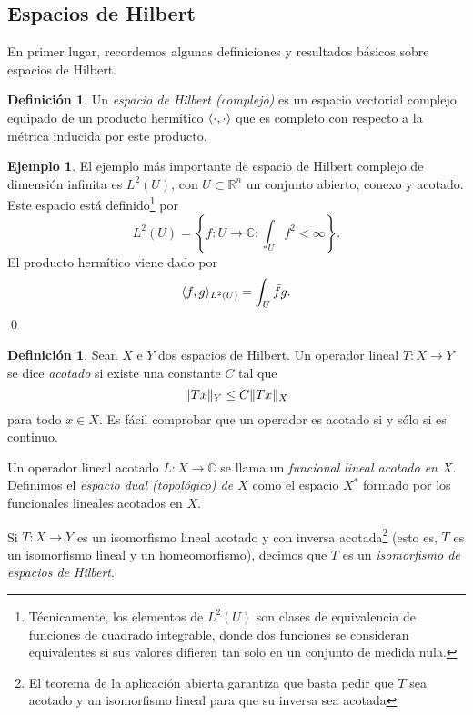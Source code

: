 \documentclass[12pt,a4paper]{article}
\theoremstyle{definition} \newtheorem{defn}[thm]{Definición}
\theoremstyle{definition} \newtheorem{ejemplo}[thm]{Ejemplo}
\theoremstyle{definition} \newtheorem{ejercicio}[thm]{Ejercicio}
\theoremstyle{remark} \newtheorem*{obs}{Observación}
\DeclarePairedDelimiter\norm{\lVert}{\rVert}
\DeclarePairedDelimiter\esc{\langle}{\rangle}
\newcommand{\RR}{\mathbb{R}}
\newcommand{\CC}{\mathbb{C}}
\begin{document}
 \subsection{Espacios de Hilbert}
 En primer lugar, recordemos algunas definiciones y resultados básicos sobre espacios de Hilbert.
 \begin{defn}
   Un \emph{espacio de Hilbert (complejo)}  es un espacio vectorial complejo equipado de un producto hermítico $\esc{\cdot,\cdot}$ que es completo con respecto a la métrica inducida por este producto.
 \end{defn}
 \begin{ejemplo}
   El ejemplo más importante de espacio de Hilbert complejo de dimensión infinita es $L^2(U)$, con $U\subset \RR^n$ un conjunto abierto, conexo y acotado. Este espacio está definido\footnote{Técnicamente, los elementos de $L^2(U)$ son clases de equivalencia de funciones de cuadrado integrable, donde dos funciones se consideran equivalentes si sus valores difieren tan solo en un conjunto de medida nula.} por
   \begin{equation*}
     L^2(U)= \left\{ f:U \rightarrow \CC : \int_U f^2 < \infty \right\}.
   \end{equation*}
   El producto hermítico viene dado por
   \begin{equation*}
     \esc{f,g}_{L^2(U)}=\int_U \bar{f} g.
   \end{equation*}
   \qed
 \end{ejemplo}
 \begin{defn}
   Sean $X$ e $Y$ dos espacios de Hilbert. Un operador lineal $T:X\rightarrow Y$ se dice \emph{acotado} si existe una constante $C$ tal que
   \begin{equation*}
     \norm{Tx}_Y \leq C \norm{Tx}_X
   \end{equation*}
   para todo $x\in X$. Es fácil comprobar que un operador es acotado si y sólo si es continuo.

   Un operador lineal acotado $L:X\rightarrow \CC$ se llama un \emph{funcional lineal acotado en $X$}. Definimos el \emph{espacio dual (topológico) de $X$} como el espacio $X^*$ formado por los funcionales lineales acotados en $X$. 

   Si $T:X\rightarrow Y$ es un isomorfismo lineal acotado y con inversa acotada\footnote{El teorema de la aplicación abierta garantiza que basta pedir que $T$ sea acotado y un isomorfismo lineal para que su inversa sea acotada} (esto es, $T$ es un isomorfismo lineal y un homeomorfismo), decimos que $T$ es un \emph{isomorfismo de espacios de Hilbert}.
 \end{defn}
\end{document}

